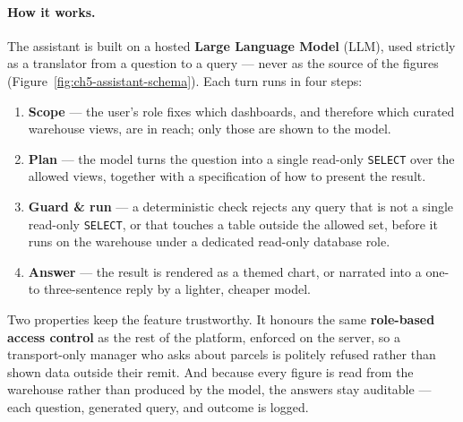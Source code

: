 
\paragraph{How it works.}
The assistant is built on a hosted \textbf{Large Language Model} (LLM), used strictly as a translator
from a question to a query --- never as the source of the figures
(Figure~\ref{fig:ch5-assistant-schema}). Each turn runs in four steps:

\begin{enumerate}[noitemsep]
    \item \textbf{Scope} --- the user's role fixes which dashboards, and therefore which curated
          warehouse views, are in reach; only those are shown to the model.
    \item \textbf{Plan} --- the model turns the question into a single read-only \texttt{SELECT} over
          the allowed views, together with a specification of how to present the result.
    \item \textbf{Guard \& run} --- a deterministic check rejects any query that is not a single
          read-only \texttt{SELECT}, or that touches a table outside the allowed set, before it runs
          on the warehouse under a dedicated read-only database role.
    \item \textbf{Answer} --- the result is rendered as a themed chart, or narrated into a one- to
          three-sentence reply by a lighter, cheaper model.
\end{enumerate}


Two properties keep the feature trustworthy. It honours the same \textbf{role-based access control} as
the rest of the platform, enforced on the server, so a transport-only manager who asks about parcels is
politely refused rather than shown data outside their remit. And because every figure is read from the
warehouse rather than produced by the model, the answers stay auditable --- each question, generated
query, and outcome is logged.

